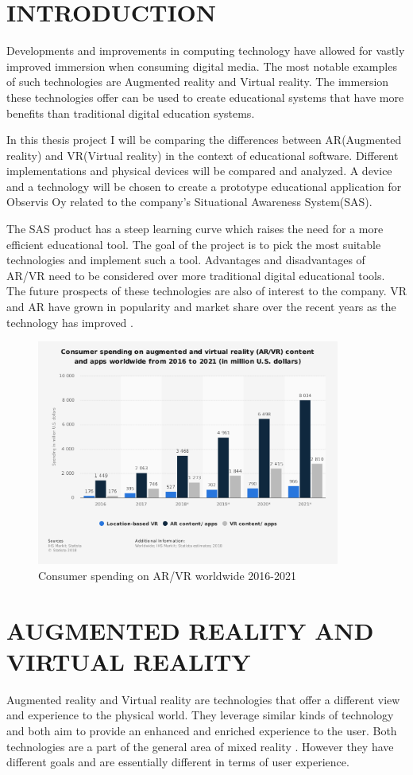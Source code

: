 \documentclass[12pt, a4paper,oneside, nocenter]{thesis}
\begin{document}
\chapter{\MakeUppercase{Introduction}}
Developments and improvements in computing technology have allowed for vastly improved immersion when consuming digital media. The most notable examples of such technologies are Augmented reality and Virtual reality. The immersion these technologies offer can be used to create educational systems that have more benefits than traditional digital education systems. \par
In this thesis project I will be comparing the differences between AR(Augmented reality) and VR(Virtual reality) in the context of educational software. Different implementations and physical devices will be compared and analyzed. A device and a technology will be chosen to create a prototype educational application for Observis Oy related to the company's Situational Awareness System(SAS).\par The SAS product has a steep learning curve which raises the need for a more efficient educational tool. The goal of the project is to pick the most suitable technologies and implement such a tool. Advantages and disadvantages of AR/VR need to be considered over more traditional digital educational tools. The future prospects of these technologies are also of interest to the company. VR and AR have grown in popularity and market share over the recent years as the technology has improved .
\begin{figure}[H]
	\centering
	\includegraphics[height=210pt]{ar-vr-consumer-spending}
	\caption{Consumer spending on AR/VR worldwide 2016-2021 \citeyearpar{ar-vr-chart}}
	\label{fig:ar-vr-consumer-spending}
\end{figure}
\chapter{\MakeUppercase{Augmented Reality and Virtual Reality}}
Augmented reality and Virtual reality are technologies that offer a different view and experience to the physical world. They leverage similar kinds of technology and both aim to provide an enhanced and enriched experience to the user. Both technologies are a part of the general area of mixed reality . However they have different goals and are essentially different in terms of user experience.
\end{document}
